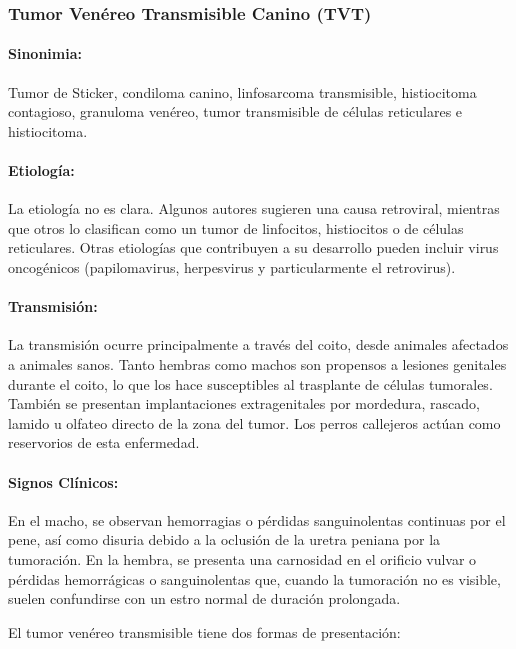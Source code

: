         \subsubsection{Tumor Venéreo Transmisible Canino (TVT)}

            \paragraph{Sinonimia:} Tumor de Sticker, condiloma canino, linfosarcoma transmisible, histiocitoma contagioso, granuloma venéreo, tumor transmisible de células reticulares e histiocitoma. 

            \paragraph{Etiología:} La etiología no es clara. Algunos autores sugieren una causa retroviral, mientras que otros lo clasifican como un tumor de linfocitos, histiocitos o de células reticulares. Otras etiologías que contribuyen a su desarrollo pueden incluir virus oncogénicos (papilomavirus, herpesvirus y particularmente el retrovirus).

            \paragraph{Transmisión:} La transmisión ocurre principalmente a través del coito, desde animales afectados a animales sanos. Tanto hembras como machos son propensos a lesiones genitales durante el coito, lo que los hace susceptibles al trasplante de células tumorales. También se presentan implantaciones extragenitales por mordedura, rascado, lamido u olfateo directo de la zona del tumor. Los perros callejeros actúan como reservorios de esta enfermedad.

            \paragraph{Signos Clínicos:} En el macho, se observan hemorragias o pérdidas sanguinolentas continuas por el pene, así como disuria debido a la oclusión de la uretra peniana por la tumoración. En la hembra, se presenta una carnosidad en el orificio vulvar o pérdidas hemorrágicas o sanguinolentas que, cuando la tumoración no es visible, suelen confundirse con un estro normal de duración prolongada.

            El tumor venéreo transmisible tiene dos formas de presentación:

